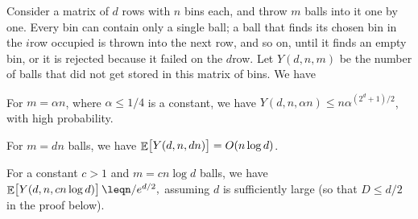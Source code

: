 \begin{lemma}
    Consider a matrix of $d$ rows with $n$ bins each, and throw $m$ balls
    into it one by one. Every bin can contain only a single ball; a ball
    that finds its chosen bin in the $i$\th row occupied is thrown into
    the next row, and so on, until it finds an empty bin, or it is
    rejected because it failed on the $d$\th row. Let $Y(d,n, m)$ be the
    number of balls that did not get stored in this matrix of bins. We
    have
    \begin{compactenumA}
        \item For $m = \alpha n$, where $\alpha \leq 1/4$ is a constant,
        we have $Y(d,n, \alpha n ) \leq n \alpha^{(2^{d} + 1)/2}$, with high
        probability.

        \item {} For $m = dn$ balls, we have
        $\mathop{\mathbb{E}}\!\left[ {\bigl. Y(d,n, dn)} \right] = O( n \log d) $.

        \item For a constant $c>1$ and $m = c n \log d$ balls, we have
        \begin{math}
            \Ex{\bigl. Y(d,n, c n \log d ) }
            \leq%
            n/e^{d/2},
        \end{math}
        assuming $d$ is sufficiently large (so that $D \leq d/2$ in
        the proof below).
    \end{compactenumA}
\end{lemma}

